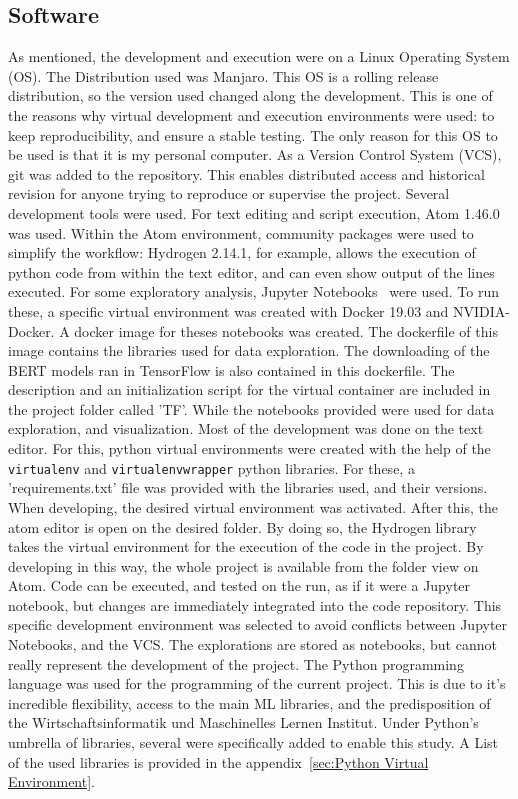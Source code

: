 \subsection{Software}\label{sub:Software}
As mentioned, the development and execution were on a Linux Operating System (OS). The Distribution used was Manjaro. This OS is a rolling release distribution, so the version used changed along the development. This is one of the reasons why virtual development and execution environments were used: to keep reproducibility, and ensure a stable testing. The only reason for this OS to be used is that it is my personal computer.
As a Version Control System (VCS), git was added to the repository. This enables distributed access and historical revision for anyone trying to reproduce or supervise the project.
Several development tools were used. For text editing and script execution, Atom 1.46.0 was used. Within the Atom environment, community packages were used to simplify the workflow: Hydrogen 2.14.1, for example, allows the execution of python code from within the text editor, and can even show output of the lines executed.
For some exploratory analysis, Jupyter Notebooks~\cite{kluyver2016jupyter} were used. To run these, a specific virtual environment was created with Docker 19.03 and NVIDIA-Docker. A docker image for theses notebooks was created. The dockerfile of this image contains the libraries used for data exploration. The downloading of the BERT models ran in TensorFlow is also contained in this dockerfile. The description and an initialization script for the virtual container are included in the project folder called 'TF'.
While the notebooks provided were used for data exploration, and visualization. Most of the development was done on the text editor. For this, python virtual environments were created with the help of the \lstinline{virtualenv} and \lstinline{virtualenvwrapper} python libraries. For these, a 'requirements.txt' file was provided with the libraries used, and their versions.
When developing, the desired virtual environment was activated. After this, the atom editor is open on the desired folder. By doing so, the Hydrogen library takes the virtual environment for the execution of the code in the project.
By developing in this way, the whole project is available from the folder view on Atom. Code can be executed, and tested on the run, as if it were a Jupyter notebook, but changes are immediately integrated into the code repository.
This specific development environment was selected to avoid conflicts between Jupyter Notebooks, and the VCS. The explorations are stored as notebooks, but cannot really represent the development of the project.
The Python programming language was used for the programming of the current project. This is due to it's incredible flexibility, access to the main ML libraries, and the predisposition of the Wirtschaftsinformatik und Maschinelles Lernen Institut. Under Python's umbrella of libraries, several were specifically added to enable this study. A List of the used libraries is provided in the appendix~\ref{sec:Python Virtual Environment}.

